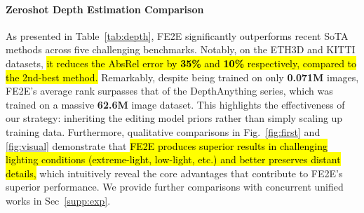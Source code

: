 \documentclass{article} %
\begin{document}
\paragraph{Zeroshot Depth Estimation Comparison}
As presented in Table~\ref{tab:depth}, FE2E significantly outperforms recent SoTA methods across five challenging benchmarks. Notably, on the ETH3D and KITTI datasets, \hl{it reduces the AbsRel error by \textbf{35\%} and \textbf{10\%} respectively, compared to the 2nd-best method.} Remarkably, despite being trained on only \textbf{0.071M} images, FE2E's average rank surpasses that of the DepthAnything series, which was trained on a massive \textbf{62.6M} image dataset. This highlights the effectiveness of our strategy: inheriting the editing model priors rather than simply scaling up training data. Furthermore, qualitative comparisons in Fig.~\ref{fig:first} and \ref{fig:visual} demonstrate that \hl{FE2E produces superior results in challenging lighting conditions (extreme-light, low-light, etc.) and better preserves distant details,} which 
intuitively reveal the core advantages that contribute to FE2E's superior performance. We provide further comparisons with concurrent unified works in Sec~\ref{supp:exp}.
\end{document}
